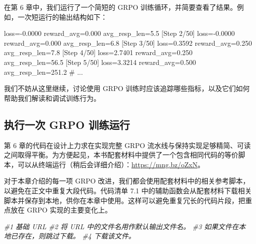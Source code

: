 在第 6 章中，我们运行了一个简短的 GRPO 训练循环，并简要查看了结果。例如，一次短运行的输出结构如下：

\begin{codebox}
[Step 1/50] loss=-0.0000 reward_avg=0.000 avg_resp_len=5.5
[Step 2/50] loss=-0.0000 reward_avg=0.000 avg_resp_len=6.8
[Step 3/50] loss=0.3592 reward_avg=0.250 avg_resp_len=7.8
[Step 4/50] loss=2.7401 reward_avg=0.250 avg_resp_len=56.5
[Step 5/50] loss=3.3214 reward_avg=0.500 avg_resp_len=251.2
# ...
\end{codebox}

我们不妨从这里继续，讨论使用 GRPO 训练时应该追踪哪些指标，以及它们如何帮助我们解读和调试训练行为。

\subsection{执行一次 GRPO 训练运行}

第 6 章的代码在设计上力求在实现完整 GRPO 流水线与保持实现足够精简、可读之间取得平衡。为方便起见，本书配套材料中提供了一个包含相同代码的等价脚本，可以从终端运行（稍后会详细介绍）：\href{https://mng.bz/oZxN}{https://mng.bz/oZxN}。

对于本章介绍的每一项 GRPO 改进，我们都会使用配套材料中的相关参考脚本，以避免在正文中重复大段代码。代码清单 7.1 中的辅助函数会从配套材料下载相关脚本并保存到本地，供你在本章中使用。这样可以避免重复冗长的代码片段，把重点放在 GRPO 实现的主要变化上。

{\noindent\small\textit{\#1 基础 URL \newline \#2 将 URL 中的文件名用作默认输出文件名。 \newline \#3 如果文件在本地已存在，则跳过下载。 \newline \#4 下载该文件。}\par}

